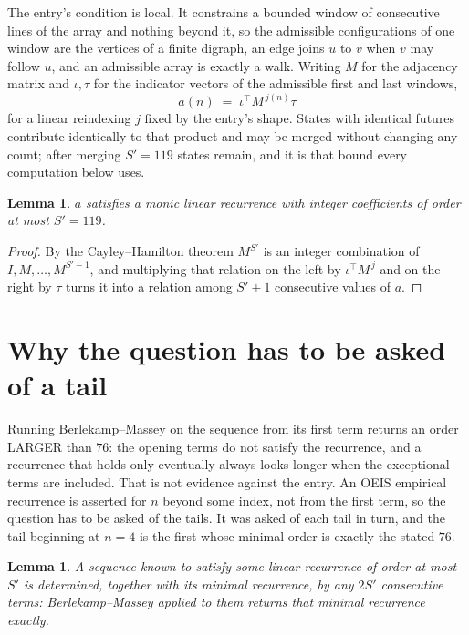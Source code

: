 \documentclass[11pt,a4paper]{article}
\theoremstyle{plain}
\newtheorem{lemma}[theorem]{Lemma}
\theoremstyle{definition}
\begin{document}
The entry's condition is local. It constrains a bounded window of consecutive lines of the
array and nothing beyond it, so the admissible configurations of one window are the vertices of
a finite digraph, an edge joins $u$ to $v$ when $v$ may follow $u$, and an admissible array is
exactly a walk. Writing $M$ for the adjacency matrix and $\iota,\tau$ for the indicator vectors
of the admissible first and last windows,
\[
a(n)\;=\;\iota^{\!\top}M^{\,j(n)}\tau
\]
for a linear reindexing $j$ fixed by the entry's shape. States with identical futures
contribute identically to that product and may be merged without changing any count; after
merging $S'=119$ states remain, and it is that bound every computation below uses.

\begin{lemma}\label{lem:cf}
$a$ satisfies a monic linear recurrence with integer coefficients of order at most $S'=119$.
\end{lemma}

\begin{proof}
By the Cayley--Hamilton theorem $M^{S'}$ is an integer combination of $I,M,\dots,M^{S'-1}$,
and multiplying that relation on the left by $\iota^{\!\top}M^{\,j}$ and on the right by
$\tau$ turns it into a relation among $S'+1$ consecutive values of $a$.
\end{proof}

\section{Why the question has to be asked of a tail}

Running Berlekamp--Massey on the sequence from its first term returns an order LARGER than $76$: the opening terms do not satisfy the recurrence, and a recurrence that holds only eventually always looks longer when the exceptional terms are included. That is not evidence against the entry. An OEIS empirical recurrence is asserted for $n$ beyond some index, not from the first term, so the question has to be asked of the tails. It was asked of each tail in turn, and the tail beginning at $n=4$ is the first whose minimal order is exactly the stated $76$.

\begin{lemma}\label{lem:bm}
A sequence known to satisfy some linear recurrence of order at most $S'$ is determined,
together with its minimal recurrence, by any $2S'$ consecutive terms: Berlekamp--Massey applied
to them returns that minimal recurrence exactly.
\end{lemma}
\end{document}
